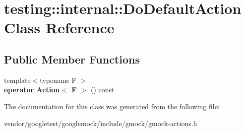\hypertarget{classtesting_1_1internal_1_1_do_default_action}{}\section{testing\+:\+:internal\+:\+:Do\+Default\+Action Class Reference}
\label{classtesting_1_1internal_1_1_do_default_action}
\subsection*{Public Member Functions}
\begin{DoxyCompactItemize}
\item 
\mbox{\label{classtesting_1_1internal_1_1_do_default_action_aea08828a0d64847e29ab7a5abeb74149}} 
{\footnotesize template$<$typename F $>$ }\\{\bfseries operator Action$<$ F $>$} () const
\end{DoxyCompactItemize}


The documentation for this class was generated from the following file\+:\begin{DoxyCompactItemize}
\item 
vendor/googletest/googlemock/include/gmock/gmock-\/actions.\+h\end{DoxyCompactItemize}
